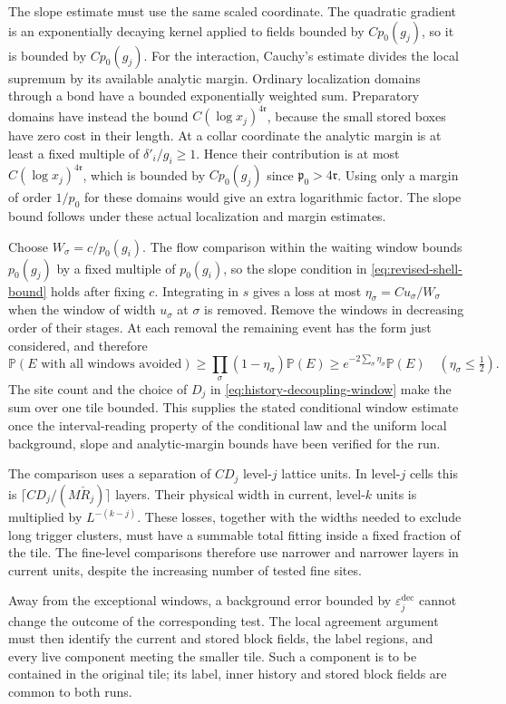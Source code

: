 \documentclass[11pt,letterpaper,reqno]{amsart}
\theoremstyle{definition}
\theoremstyle{remark}
\begin{document}
The slope estimate must use the same scaled coordinate. The
quadratic gradient is an exponentially decaying kernel applied
to fields bounded by $Cp_0(g_j)$, so it is bounded by
$Cp_0(g_j)$. For the interaction, Cauchy's estimate divides
the local supremum by its available analytic margin.
Ordinary localization domains through a bond have a bounded
exponentially weighted sum. Preparatory domains have instead
the bound $C(\log x_j)^{4\mathfrak r}$, because the small
stored boxes have zero cost in their length. At a collar
coordinate the analytic margin is at least a fixed multiple
of $\delta'_i/g_i\ge1$. Hence their contribution is at most
$C(\log x_j)^{4\mathfrak r}$, which is bounded by
$Cp_0(g_j)$ since $\mathfrak p_0>4\mathfrak r$.
Using only a margin of order $1/p_0$ for these domains would
give an extra logarithmic factor. The slope bound follows
under these actual localization and margin estimates.

Choose $W_\sigma=c/p_0(g_i)$. The flow comparison within
the waiting window bounds $p_0(g_j)$ by a fixed multiple of
$p_0(g_i)$, so the slope condition in
\eqref{eq:revised-shell-bound} holds after fixing $c$.
Integrating in $s$ gives a loss at most
$\eta_\sigma=Cu_\sigma/W_\sigma$ when the window of
width $u_\sigma$ at $\sigma$ is removed. Remove the windows
in decreasing order of their stages. At each removal the
remaining event has the form just considered, and therefore
\[
 \mathbb P(E\text{ with all windows avoided})
 \ge \prod_\sigma(1-\eta_\sigma)\mathbb P(E)
 \ge e^{-2\sum_\sigma\eta_\sigma}\mathbb P(E)
 \quad(\eta_\sigma\le\tfrac12).
\]
The site count and the choice of $D_j$ in
\eqref{eq:history-decoupling-window} make the sum over one
tile bounded. This supplies the stated conditional window
estimate once the interval-reading property of the conditional
law and the uniform local background, slope and analytic-margin
bounds have been verified for the run.

The comparison uses a separation of $CD_j$ level-$j$ lattice
units. In level-$j$ cells this is
$\lceil CD_j/(M\check R_j)\rceil$ layers. Their physical width
in current, level-$k$ units is multiplied by $L^{-(k-j)}$.
These losses, together with the widths needed to exclude long
trigger clusters, must have a summable total fitting inside a
fixed fraction of the tile. The fine-level comparisons therefore
use narrower and narrower layers in current units, despite the
increasing number of tested fine sites.

Away from the exceptional windows, a background error bounded by
$\varepsilon_j^{\mathrm{dec}}$ cannot change the outcome of the
corresponding test. The local agreement argument must then identify
the current and stored block fields, the label regions, and every
live component meeting the smaller tile. Such a component is to
be contained in the original tile; its label, inner history and
stored block fields are common to both runs.
\end{document}
